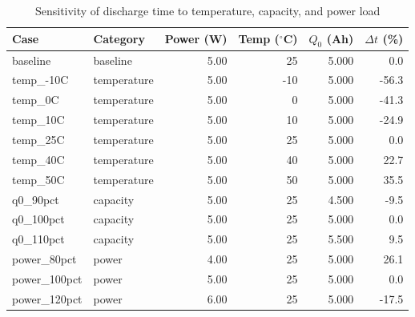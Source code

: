 \begin{table}[h]
\centering
\caption{Sensitivity of discharge time to temperature, capacity, and power load}
\label{tab:sensitivity}
\begin{tabular}{llrrrr}
\hline
Case & Category & Power (W) & Temp ($^\circ$C) & $Q_0$ (Ah) & $\Delta t$ (\%)\\
\hline
baseline & baseline & 5.00 & 25 & 5.000 & 0.0\\
temp_-10C & temperature & 5.00 & -10 & 5.000 & -56.3\\
temp_0C & temperature & 5.00 & 0 & 5.000 & -41.3\\
temp_10C & temperature & 5.00 & 10 & 5.000 & -24.9\\
temp_25C & temperature & 5.00 & 25 & 5.000 & 0.0\\
temp_40C & temperature & 5.00 & 40 & 5.000 & 22.7\\
temp_50C & temperature & 5.00 & 50 & 5.000 & 35.5\\
q0_90pct & capacity & 5.00 & 25 & 4.500 & -9.5\\
q0_100pct & capacity & 5.00 & 25 & 5.000 & 0.0\\
q0_110pct & capacity & 5.00 & 25 & 5.500 & 9.5\\
power_80pct & power & 4.00 & 25 & 5.000 & 26.1\\
power_100pct & power & 5.00 & 25 & 5.000 & 0.0\\
power_120pct & power & 6.00 & 25 & 5.000 & -17.5\\
\hline
\end{tabular}
\end{table}
